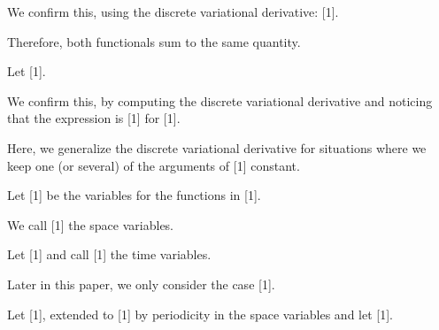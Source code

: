 \documentclass{amsart}
\begin{document}
\noindent   We confirm this, using the discrete variational derivative: [1].

\noindent  

\noindent {\color{green} ********************}



\noindent {\color{green} ********************}

\noindent  Therefore, both functionals sum to the same quantity.

\noindent   Let [1].

\noindent  

\noindent {\color{green} ********************}



\noindent {\color{green} ********************}

\noindent  We confirm this, by computing the discrete variational derivative and noticing that the expression is [1] for [1].

\noindent  

\noindent {\color{green} ********************}



\noindent {\color{green} ********************}

\noindent  Here, we generalize the discrete variational derivative for situations where we keep one (or several) of the arguments of [1] constant.

\noindent   Let [1] be the variables for the functions in [1].

\noindent   We call [1] the space variables.

\noindent   Let [1] and call [1] the time variables.

\noindent   Later in this paper, we only consider the case [1].

\noindent   Let [1], extended to [1] by periodicity in the space variables and let [1].
\end{document}
